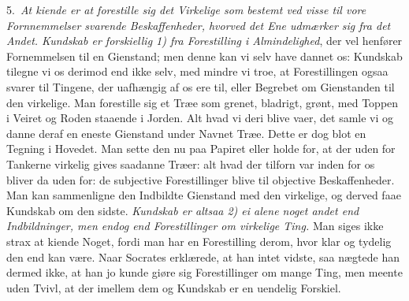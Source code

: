 \documentclass[12pt,a4paper]{article}
\newcommand{\opage}[1]{\marginnote{\footnotesize\textit{[#1]}}}
\begin{document}
5.~\emph{At kiende er at forestille sig det Virkelige som bestemt ved visse til
vore Fornnemmelser svarende Beskaffenheder, hvorved det Ene udmærker sig fra det
Andet. Kundskab er forskiellig 1) fra Forestilling i Almindelighed}, der vel
henfører Fornemmelsen til en Gienstand; men denne kan vi selv have dannet os:
Kundskab tilegne vi os derimod end ikke selv, med mindre vi troe, at
Forestillingen ogsaa svarer til Tingene, der uafhængig af os ere til, eller
Begrebet om Gienstanden til den virkelige. Man forestille sig et Træe som grenet,
bladrigt, grønt, med Toppen i Veiret og Roden staaende i Jorden. Alt hvad vi deri
blive vaer, det samle vi og danne deraf en eneste Gienstand under Navnet Træe.
Dette er dog blot en Tegning i Hovedet. Man sette den nu paa Papiret eller holde
for, at der uden for Tankerne virkelig gives saadanne Træer: alt hvad der tilforn
var inden for os bliver da uden for: de subjective Forestillinger blive til
\opage{44} objective Beskaffenheder. Man kan sammenligne den Indbildte Gienstand med den
virkelige, og derved faae Kundskab om den sidste. \emph{Kundskab er altsaa 2) ei
alene noget andet end Indbildninger, men endog end Forestillinger om virkelige
Ting.} Man siges ikke strax at kiende Noget, fordi man har en Forestilling derom,
hvor klar og tydelig den end kan være. Naar Socrates erklærede, at han intet
vidste, saa nægtede han dermed ikke, at han jo kunde giøre sig Forestillinger om
mange Ting, men meente uden Tvivl, at der imellem dem og Kundskab er en uendelig
Forskiel.
\end{document}
